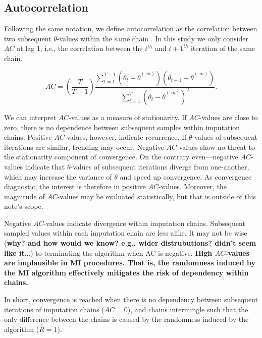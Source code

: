 \documentclass[Royal,times,sageh]{sagej}
\begin{document}
\hypertarget{autocorrelation}{%
\subsection{Autocorrelation}\label{autocorrelation}}

Following the same notation, we define autocorrelation as the
correlation between two subsequent \(\theta\)-values within the same
chain \citep[p.~147]{lync07}. In this study we only consider \(AC\) at
lag 1, i.e., the correlation between the \(t^{th}\) and \(t+1^{th}\)
iteration of the same chain.

\begin{equation*}
AC = \left( \frac{T}{T-1} \right) \frac{\sum_{t=1}^{T-1}(\theta_t - \bar{\theta}^{(\cdot m)})(\theta_{t+1} - \bar{\theta}^{(\cdot m)})}{\sum_{t=1}^{T}(\theta_t - \bar{\theta}^{(\cdot m)})^2}.
\end{equation*}

We can interpret \(AC\)-values as a measure of stationarity. If
\(AC\)-values are close to zero, there is no dependence between
subsequent samples within imputation chains. Positive \(AC\)-values,
however, indicate recurrence. If \(\theta\)-values of subsequent
iterations are similar, trending may occur. Negative \(AC\)-values show
no threat to the stationarity component of convergence. On the contrary
even---negative \(AC\)-values indicate that \(\theta\)-values of
subsequent iterations diverge from one-another, which may increase the
variance of \(\theta\) and speed up convergence. As convergence
diagnostic, the interest is therefore in positive \(AC\)-values.
Moreover, the magnitude of \(AC\)-values may be evaluated statistically,
but that is outside of this note's scope.

Negative \(AC\)-values indicate divergence within imputation chains.
Subsequent sampled values within each imputation chain are less alike.
It may not be wise (\textbf{why? and how would we know? e.g., wider
distrubutions? didn't seem like it\ldots{}}) to terminating the
algorithm when AC is negative. \textbf{High \(AC\)-values are
implausible in MI procedures. That is, the randomness induced by the MI
algorithm effectively mitigates the risk of dependency within chains.}

In short, convergence is reached when there is no dependency between
subsequent iterations of imputation chains (\(AC = 0\)), and chains
intermingle such that the only difference between the chains is caused
by the randomness induced by the algorithm (\(\widehat{R} = 1\)).
\end{document}
